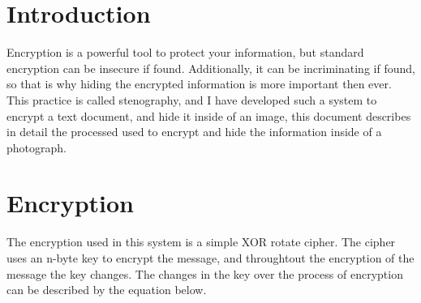 \documentclass[12pt,draft]{article}
\begin{document}
\section{Introduction}
  Encryption is a powerful tool to protect your information, but standard
  encryption can be insecure if found. Additionally, it can be incriminating
  if found, so that is why hiding the encrypted information is more important
  then ever. This practice is called stenography, and I have developed such
  a system to encrypt a text document, and hide it inside of an image, this
  document describes in detail the processed used to encrypt and hide the
  information inside of a photograph.

\section{Encryption}
  The encryption used in this system is a simple XOR rotate cipher.
  The cipher uses an n-byte key to encrypt the message, and
  throughtout the encryption of the message the key changes. The
  changes in the key over the process of encryption can be described
  by the equation below.
  \begin{math}
  \end{math}
\end{document}
